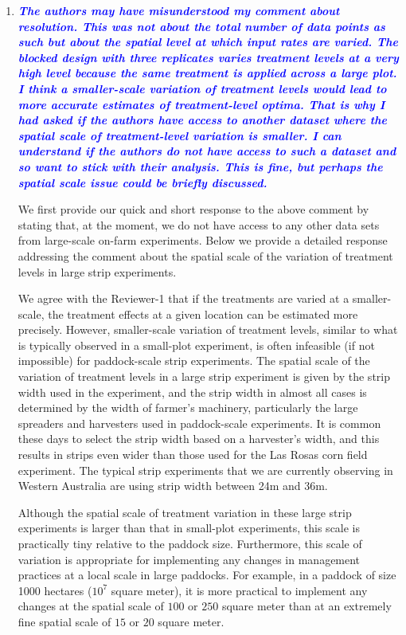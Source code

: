 \documentclass[a4paper]{article}   	%
\newcommand{\qtitle}[1]{\textit{\textbf{#1}}}
\begin{document}
\begin{enumerate}
    \item \qtitle{\textcolor{blue}{The authors may have misunderstood my comment about resolution. This was not about the total number of data points as such but about the spatial level at which input rates are varied. The blocked design with three replicates varies treatment levels at a very high level because the same treatment is applied across a large plot. I think a smaller-scale variation of treatment levels would lead to more accurate estimates of treatment-level optima. That is why I had asked if the authors have access to another dataset where the spatial scale of treatment-level variation is smaller. I can understand if the authors do not have access to such a dataset and so want to stick with their analysis. This is fine, but perhaps the spatial scale issue could be briefly discussed.}}
    

We first provide our quick and short response to the above comment by stating that, at the moment, we do not have access to any other data sets from large-scale on-farm experiments. Below we provide a detailed response addressing the comment about the spatial scale of the variation of treatment levels in large strip experiments. 


We agree with the Reviewer-1 that if the treatments are varied at a smaller-scale, the treatment effects at a given location can be estimated more precisely. However, smaller-scale variation of treatment levels, similar to what is typically observed in a small-plot experiment, is often infeasible (if not impossible) for paddock-scale strip experiments. The spatial scale of the variation of treatment levels in a large strip experiment is given by the strip width used in the experiment, and the strip width in almost all cases is determined by the width of farmer's machinery, particularly the large spreaders and harvesters used in paddock-scale experiments. It is common these days to select the strip width based on a harvester's width, and this results in strips even wider than those used for the Las Rosas corn field experiment. The typical strip experiments that we are currently observing in Western Australia are using strip width between 24m and 36m. 

Although the spatial scale of treatment variation in these large strip experiments is larger than that in small-plot experiments, this scale is practically tiny relative to the paddock size. Furthermore, this scale of variation is appropriate for implementing any changes in management practices at a local scale in large paddocks. For example, in a paddock of size 1000 hectares ($10^{7}$ square meter), it is more practical to implement any changes at the spatial scale of $100$ or $250$ square meter than at an extremely fine spatial scale of $15$ or $20$ square meter. 


\end{enumerate}
\end{document}
